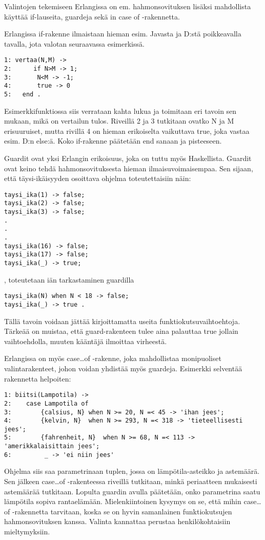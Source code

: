 \documentclass[11pt,oneside,a4paper]{article}
\begin{document}
Valintojen tekemiseen Erlangissa on em. hahmonsovituksen lisäksi mahdollista
käyttää if-lauseita, guardeja sekä in case of -rakennetta.

Erlangissa if-rakenne ilmaistaan hieman esim. Javasta ja D:stä poikkeavalla
tavalla, jota valotan seuraavassa esimerkissä. 

\begin{verbatim}
1: vertaa(N,M) -> 
2: 		if N>M -> 1;
3:	     N<M -> -1;
4:	     true -> 0
5: 	 end . 
\end{verbatim}

Esimerkkifunktiossa siis verrataan kahta lukua ja toimitaan eri tavoin sen
mukaan, mikä on vertailun tulos. Riveillä 2 ja 3 tutkitaan ovatko N ja M
erisuuruiset, mutta rivillä 4 on hieman erikoiselta
vaikuttava true, joka vastaa esim. D:n else:ä. Koko if-rakenne päätetään end
sanaan ja pisteeseen. 

Guardit ovat yksi Erlangin erikoisuus, joka on tuttu myös Haskellista. Guardit
ovat keino tehdä hahmonsovituksesta hieman ilmaisuvoimaisempaa. Sen sijaan, että
täysi-ikäisyyden osoittava ohjelma 
toteutettaisiin näin: 
\begin{verbatim}
taysi_ika(1) -> false;
taysi_ika(2) -> false;
taysi_ika(3) -> false;
.
.
.
taysi_ika(16) -> false;
taysi_ika(17) -> false;
taysi_ika(_) -> true;
\end{verbatim}
, toteutetaan iän tarkastaminen guardilla
\begin{verbatim}
taysi_ika(N) when N < 18 -> false;
taysi_ika(_) -> true . 
\end{verbatim}

Tällä tavoin voidaan jättää kirjoittamatta useita funktiokutsuvaihtoehtoja. 
Tärkeää on muistaa, että guard-rakenteen tulee aina palauttaa true jollain
vaihtoehdolla, muuten kääntäjä ilmoittaa virheestä.  

Erlangissa on myös case…of -rakenne, joka mahdollistaa monipuoliset
valintarakenteet, johon voidan yhdistää myös guardeja. Esimerkki selventää
rakennetta helpoiten:
\begin{verbatim}
1: biitsi(Lampotila) -> 
2:    case Lampotila of
3:        {calsius, N} when N >= 20, N =< 45 -> 'ihan jees';
4:        {kelvin, N}  when N >= 293, N =< 318 -> 'tieteellisesti jees';  
5:        {fahrenheit, N}  when N >= 68, N =< 113 -> 'amerikkalaisittain jees'; 
6:         _ -> 'ei niin jees' 
\end{verbatim}

Ohjelma siis saa parametrinaan tuplen, jossa on lämpötila-asteikko ja astemäärä.
Sen jälkeen case…of -rakenteessa riveillä  tutkitaan, minkä periaatteen
mukaisesti astemäärää tutkitaan. Lopulta guardin avulla päätetään, onko
parametrina 
saatu lämpötila sopiva rantaelämään. Mielenkiintoinen kysymys on se, että mihin
case…of -rakennetta tarvitaan, koska se on hyvin samanlainen funktiokutsujen
hahmonsovituksen kanssa. Valinta kannattaa perustaa henkilökohtaisiin
mieltymyksiin. 
\end{document}
